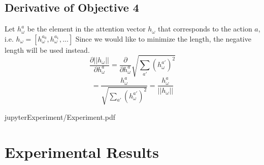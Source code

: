 \documentclass{article}
\begin{document}
	\subsection{Derivative of Objective 4}
	Let $h_\omega^a$ be the element in the attention vector $h_\omega$ that corresponds to the action $a$, i.e. $h_\omega = [h_\omega^{a_0}, h_\omega^{a_1}, ...]$
	Since we would like to minimize the length, the negative length will be used instead.
	$$\frac{\partial ||h_\omega||}{\partial h_\omega^a} = \frac{\partial}{\partial h_\omega^a} \sqrt{\sum_{a'} (h_\omega^{a'})^2}$$
	$$= \frac{h_\omega^a}{\sqrt{\sum_{a'} (h_\omega^{a'})^2}} = \frac{h_\omega^a}{||h_\omega||}$$
	
	{jupyterExperiment/Experiment.pdf}
	\section{Experimental Results}
\end{document}
